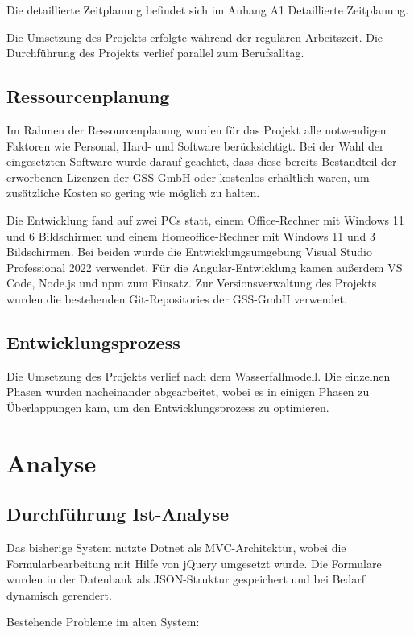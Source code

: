\documentclass[a4paper,11pt]{article}
\begin{document}
Die detaillierte Zeitplanung befindet sich im Anhang A1 Detaillierte Zeitplanung.

Die Umsetzung des Projekts erfolgte während der regulären Arbeitszeit. Die Durchführung des Projekts verlief parallel zum Berufsalltag.

\subsection{Ressourcenplanung}

Im Rahmen der Ressourcenplanung wurden für das Projekt alle notwendigen Faktoren wie Personal, Hard- und Software berücksichtigt. Bei der Wahl der eingesetzten Software wurde darauf geachtet, dass diese bereits Bestandteil der erworbenen Lizenzen der GSS-GmbH oder kostenlos erhältlich waren, um zusätzliche Kosten so gering wie möglich zu halten.

Die Entwicklung fand auf zwei PCs statt, einem Office-Rechner mit Windows 11 und 6 Bildschirmen und einem Homeoffice-Rechner mit Windows 11 und 3 Bildschirmen. Bei beiden wurde die Entwicklungsumgebung Visual Studio Professional 2022 verwendet. Für die Angular-Entwicklung kamen außerdem VS Code, Node.js und npm zum Einsatz. Zur Versionsverwaltung des Projekts wurden die bestehenden Git-Repositories der GSS-GmbH verwendet.

\subsection{Entwicklungsprozess}

Die Umsetzung des Projekts verlief nach dem Wasserfallmodell. Die einzelnen Phasen wurden nacheinander abgearbeitet, wobei es in einigen Phasen zu Überlappungen kam, um den Entwicklungsprozess zu optimieren.

\section{Analyse}

\subsection{Durchführung Ist-Analyse}

Das bisherige System nutzte Dotnet als MVC-Architektur, wobei die Formularbearbeitung mit Hilfe von jQuery umgesetzt wurde. Die Formulare wurden in der Datenbank als JSON-Struktur gespeichert und bei Bedarf dynamisch gerendert.

Bestehende Probleme im alten System:
\end{document}
